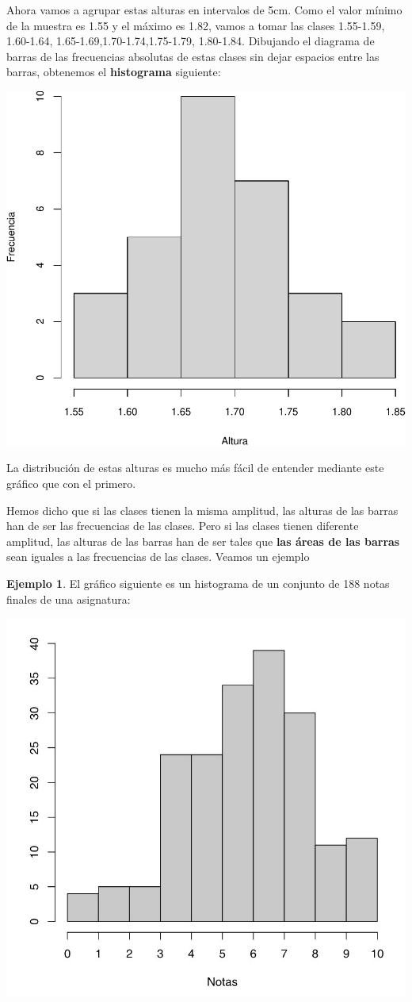 \documentclass[
]{book}
\theoremstyle{definition}
\theoremstyle{definition}
\newtheorem{example}{Ejemplo}[chapter]
\theoremstyle{definition}
\theoremstyle{definition}
\theoremstyle{remark}
\begin{document}
Ahora vamos a agrupar estas alturas en intervalos de 5cm. Como el valor mínimo de la muestra es 1.55 y el máximo es 1.82, vamos a tomar las clases 1.55-1.59, 1.60-1.64, 1.65-1.69,1.70-1.74,1.75-1.79, 1.80-1.84. Dibujando el diagrama de barras de las frecuencias absolutas de estas clases sin dejar espacios entre las barras, obtenemos el \textbf{histograma} siguiente:

\begin{center}\includegraphics[width=0.6\linewidth]{INREMDN_files/figure-latex/unnamed-chunk-283-1} \end{center}

La distribución de estas alturas es mucho más fácil de entender mediante este gráfico que con el primero.

Hemos dicho que si las clases tienen la misma amplitud, las alturas de las barras han de ser las frecuencias de las clases. Pero si las clases tienen diferente amplitud, las alturas de las barras han de ser tales que \textbf{las áreas de las barras} sean iguales a las frecuencias de las clases. Veamos un ejemplo

\begin{example}
\protect\hypertarget{exm:histnotas}{}\label{exm:histnotas}El gráfico siguiente es un histograma de un conjunto de 188 notas finales de una asignatura:
\end{example}

\begin{center}\includegraphics[width=0.6\linewidth]{INREMDN_files/figure-html/histnotas1} \end{center}
\end{document}
